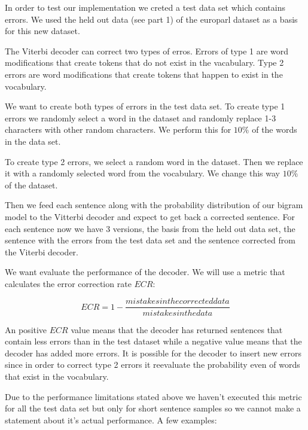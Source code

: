 \documentclass[a4paper]{article}
\begin{document}
In order to test our implementation we creted a test data set which contains
errors. We used the held out data (see part 1) of the europarl dataset as a
basis for this new dataset.

The Viterbi decoder can correct two types of erros. Errors of type 1 are
word modifications that create tokens that do not exist in the vacabulary. Type
2 errors are word modifications that create tokens that happen to exist in the
vocabulary.

We want to create both types of errors in the test data set. To create type 1
errors we randomly select a word in the dataset and randomly replace 1-3
characters with other random characters. We perform this for $10\%$ of the words
in the data set.

To create type 2 errors, we select a random word in the dataset. Then we replace
it with a randomly selected word from the vocabulary. We change this way $10\%$
of the dataset.

Then we feed each sentence along with the probability distribution of our bigram
model to the Vitterbi decoder and expect to get back a corrected sentence. For
each sentence now we have 3 versions, the basis from the held out data set, the
sentence with the errors from the test data set and the sentence corrected from
the Viterbi decoder.

We want evaluate the performance of the decoder. We will use a metric that
calculates the error correction rate $ECR$:

$$
ECR = 1 - \frac{mistakes in the corrected data}{mistakes in the data}
$$

An positive $ECR$ value means that the decoder has returned sentences that
contain less errors than in the test dataset while a negative value means that
the decoder has added more errors. It is possible for the decoder to insert new
errors since in order to correct type 2 errors it reevaluate the probability
even of words that exist in the vocabulary.

Due to the performance limitations stated above we haven't executed this metric
for all the test data set but only for short sentence samples so we cannot make
a statement about it's actual performance. A few examples:
\end{document}
